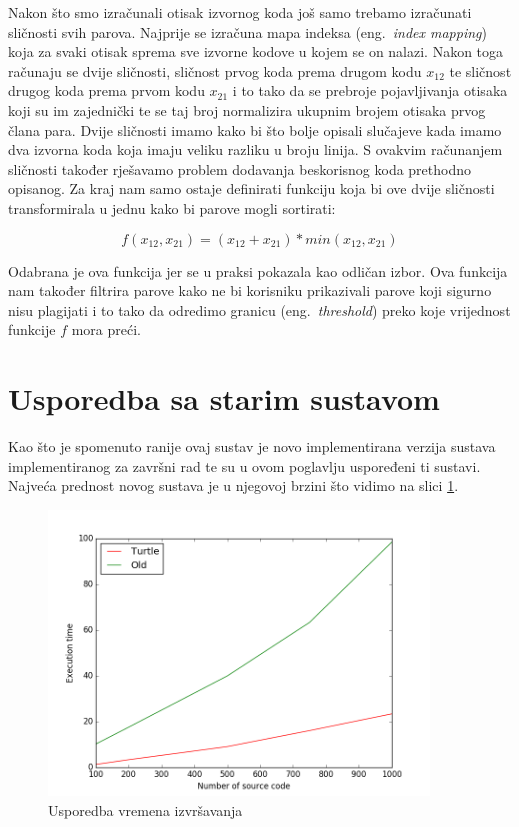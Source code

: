 Nakon što smo izračunali otisak izvornog koda još samo trebamo izračunati sličnosti svih parova. Najprije se izračuna mapa indeksa (eng.~\textit{index mapping}) koja za svaki otisak sprema sve izvorne kodove u kojem se on nalazi. Nakon toga računaju se dvije sličnosti, sličnost prvog koda prema drugom kodu $x_{12}$ te sličnost drugog koda prema prvom kodu $x_{21}$ i to tako da se prebroje pojavljivanja otisaka koji su im zajednički te se taj broj normalizira ukupnim brojem otisaka prvog člana para. Dvije sličnosti imamo kako bi što bolje opisali slučajeve kada imamo dva izvorna koda koja imaju veliku razliku u broju linija. S ovakvim računanjem sličnosti također rješavamo problem dodavanja beskorisnog koda prethodno opisanog.  Za kraj nam samo ostaje definirati funkciju koja bi ove dvije sličnosti transformirala u jednu kako bi parove mogli sortirati: 

\begin{equation}
	f(x_{12}, x_{21}) = (x_{12} + x_{21}) * min(x_{12}, x_{21})
\end{equation}

\noindent Odabrana je ova funkcija jer se u praksi pokazala kao odličan izbor. Ova funkcija nam također filtrira parove kako ne bi korisniku prikazivali parove koji sigurno nisu plagijati i to tako da odredimo granicu (eng.~\textit{threshold}) preko koje vrijednost funkcije $f$ mora preći.

\section{Usporedba sa starim sustavom}

Kao što je spomenuto ranije ovaj sustav je novo implementirana verzija sustava implementiranog za završni rad te su u ovom poglavlju uspoređeni ti sustavi. Najveća prednost novog sustava je u njegovoj brzini što vidimo na slici \ref{fig:execution_time}.

\begin{figure}[htb]
	\centering
	\includegraphics[width=0.9\textwidth,keepaspectratio]{fig/execution_time.png}
	\caption{Usporedba vremena izvršavanja}
	\label{fig:execution_time}
\end{figure}


